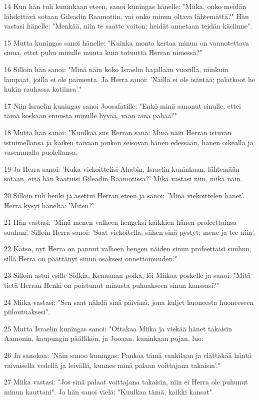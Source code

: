 \par 14 Kun hän tuli kuninkaan eteen, sanoi kuningas hänelle: "Miika, onko meidän lähdettävä sotaan Gileadin Raamotiin, vai onko minun oltava lähtemättä?" Hän vastasi hänelle: "Menkää, niin te saatte voiton; heidät annetaan teidän käsiinne".
\par 15 Mutta kuningas sanoi hänelle: "Kuinka monta kertaa minun on vannotettava sinua, ettet puhu minulle muuta kuin totuutta Herran nimessä?"
\par 16 Silloin hän sanoi: "Minä näin koko Israelin hajallaan vuorilla, niinkuin lampaat, joilla ei ole paimenta. Ja Herra sanoi: 'Näillä ei ole isäntää; palatkoot he kukin rauhassa kotiinsa'."
\par 17 Niin Israelin kuningas sanoi Joosafatille: "Enkö minä sanonut sinulle, ettei tämä koskaan ennusta minulle hyvää, vaan aina pahaa?"
\par 18 Mutta hän sanoi: "Kuulkaa siis Herran sana: Minä näin Herran istuvan istuimellansa ja kaiken taivaan joukon seisovan hänen edessään, hänen oikealla ja vasemmalla puolellansa.
\par 19 Ja Herra sanoi: 'Kuka viekoittelisi Ahabin, Israelin kuninkaan, lähtemään sotaan, että hän kaatuisi Gileadin Raamotissa?' Mikä vastasi niin, mikä näin.
\par 20 Silloin tuli henki ja asettui Herran eteen ja sanoi: 'Minä viekoittelen hänet'. Herra kysyi häneltä: 'Miten?'
\par 21 Hän vastasi: 'Minä menen valheen hengeksi kaikkien hänen profeettainsa suuhun'. Silloin Herra sanoi: 'Saat viekoitella, siihen sinä pystyt; mene ja tee niin'.
\par 22 Katso, nyt Herra on pannut valheen hengen näiden sinun profeettaisi suuhun, sillä Herra on päättänyt sinun osaksesi onnettomuuden."
\par 23 Silloin astui esille Sidkia, Kenaanan poika, löi Miikaa poskelle ja sanoi: "Mitä tietä Herran Henki on poistunut minusta puhuakseen sinun kanssasi?"
\par 24 Miika vastasi: "Sen saat nähdä sinä päivänä, jona kuljet huoneesta huoneeseen piiloutuaksesi".
\par 25 Mutta Israelin kuningas sanoi: "Ottakaa Miika ja viekää hänet takaisin Aamonin, kaupungin päällikön, ja Jooaan, kuninkaan pojan, luo.
\par 26 Ja sanokaa: 'Näin sanoo kuningas: Pankaa tämä vankilaan ja elättäkää häntä vaivaisella vedellä ja leivällä, kunnes minä palaan voittajana takaisin'."
\par 27 Miika vastasi: "Jos sinä palaat voittajana takaisin, niin ei Herra ole puhunut minun kauttani". Ja hän sanoi vielä: "Kuulkaa tämä, kaikki kansat".
